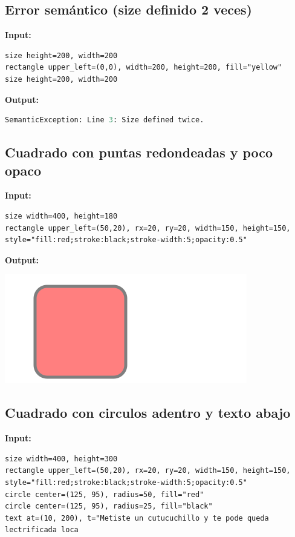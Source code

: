 \documentclass{article}
\theoremstyle{definition}
\theoremstyle{remark}
\begin{document}
\subsection{Error semántico (size definido 2 veces)}

\textbf{Input:}
\begin{lstlisting}
size height=200, width=200
rectangle upper_left=(0,0), width=200, height=200, fill="yellow"
size height=200, width=200
\end{lstlisting}

\textbf{Output:}

\begin{lstlisting}[language=Python]
    SemanticException: Line 3: Size defined twice.
\end{lstlisting}

\subsection{Cuadrado con puntas redondeadas y poco opaco}

\textbf{Input:}
\begin{lstlisting}
size width=400, height=180
rectangle upper_left=(50,20), rx=20, ry=20, width=150, height=150, style="fill:red;stroke:black;stroke-width:5;opacity:0.5"
\end{lstlisting}

\textbf{Output:}

\includegraphics{4.png}

\subsection{Cuadrado con circulos adentro y texto abajo}

\textbf{Input:}
\begin{lstlisting}
size width=400, height=300
rectangle upper_left=(50,20), rx=20, ry=20, width=150, height=150, style="fill:red;stroke:black;stroke-width:5;opacity:0.5"
circle center=(125, 95), radius=50, fill="red"
circle center=(125, 95), radius=25, fill="black"
text at=(10, 200), t="Metiste un cutucuchillo y te pode queda lectrificada loca
\end{lstlisting}
\end{document}
